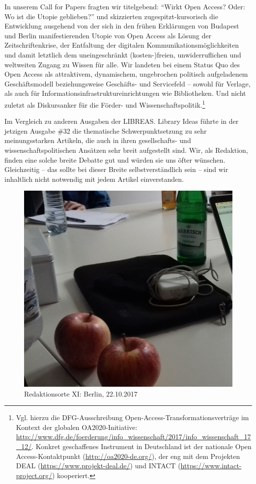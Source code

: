 \documentclass[a4paper,
fontsize=11pt,
oneside,
numbers=noperiodatend,
parskip=half-,
bibliography=totoc,
final
]{scrartcl}
\begin{document}
In unserem Call for Papers fragten wir titelgebend: \enquote{Wirkt Open
Access? Oder: Wo ist die Utopie geblieben?} und skizzierten
zugespitzt-kursorisch die Entwicklung ausgehend von der sich in den
frühen Erklärungen von Budapest und Berlin manifestierenden Utopie von
Open Access als Lösung der Zeitschriftenkrise, der Entfaltung der
digitalen Kommunikationsmöglichkeiten und damit letztlich dem
uneingeschränkt (kosten-)freien, unwiderruflichen und weltweiten Zugang
zu Wissen für alle. Wir landeten bei einem Status Quo des Open Access
als attraktivem, dynamischem, ungebrochen politisch aufgeladenem
Geschäftsmodell beziehungsweise Geschäfts- und Servicefeld -- sowohl für
Verlage, als auch für Informationsinfrastruktureinrichtungen wie
Bibliotheken. Und nicht zuletzt als Diskursanker für die Förder- und
Wissenschaftspolitik.\footnote{Vgl. hierzu die DFG-Ausschreibung
  Open-Access-Transformationsverträge im Kontext der globalen
  OA2020-Initiative:
  \url{http://www.dfg.de/foerderung/info_wissenschaft/2017/info_wissenschaft_17_12/}.
  Konkret geschaffenes Instrument in Deutschland ist der nationale Open
  Access-Kontaktpunkt (\url{http://oa2020-de.org/}), der eng mit dem
  Projekten DEAL (\url{https://www.projekt-deal.de/}) und INTACT
  (\url{https://www.intact-project.org/}) kooperiert.}

Im Vergleich zu anderen Ausgaben der LIBREAS. Library Ideas führte in
der jetzigen Ausgabe \#32 die thematische Schwerpunktsetzung zu sehr
meinungsstarken Artikeln, die auch in ihren gesellschafts- und
wissenschaftspolitischen Ansätzen sehr breit aufgestellt sind. Wir, als
Redaktion, finden eine solche breite Debatte gut und würden sie uns
öfter wünschen. Gleichzeitig -- das sollte bei dieser Breite
selbstverständlich sein -- sind wir inhaltlich nicht notwendig mit jedem
Artikel einverstanden.

\begin{figure}
\centering
\includegraphics{editorial.png}
\caption{Redaktionsorte XI: Berlin, 22.10.2017}
\end{figure}
\end{document}
